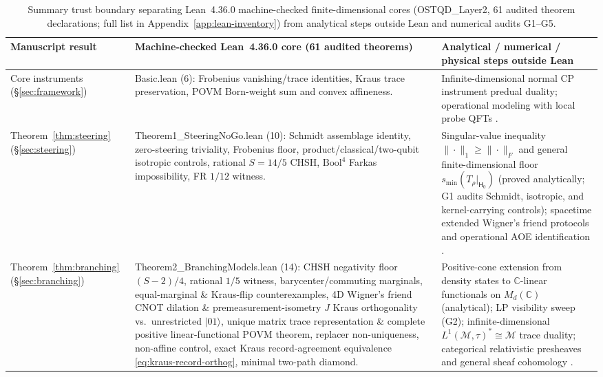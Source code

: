 \documentclass[11pt,a4paper]{article}
\theoremstyle{definition}
\theoremstyle{remark}
\newcommand{\cM}{\mathcal{M}}
\newcommand{\bbC}{\mathbb{C}}
\newcommand{\1}{\mathbf{1}}
\newcommand{\code}[1]{{\scriptsize\ttfamily #1}}
\begin{document}
\begin{table}[!tb]
\centering
\caption{Summary trust boundary separating Lean~4.36.0 machine-checked finite-dimensional cores (\code{OSTQD\_Layer2}, 61 audited theorem declarations; full list in Appendix~\ref{app:lean-inventory}) from analytical steps outside Lean and numerical audits G1--G5.}
\label{tab:trust-boundary}
\scriptsize
\begin{tabular}{@{} >{\raggedright\arraybackslash}p{2.3cm} >{\raggedright\arraybackslash}p{6.2cm} >{\raggedright\arraybackslash}p{6.2cm} @{}}
\toprule
Manuscript result & Machine-checked Lean~4.36.0 core (61 audited theorems) & Analytical / numerical / physical steps outside Lean \\
\midrule
Core instruments (\S\ref{sec:framework}) &
\code{Basic.lean} (6): Frobenius vanishing/trace identities, Kraus trace preservation, POVM Born-weight sum and convex affineness. &
Infinite-dimensional normal CP instrument predual duality; operational modeling with local probe QFTs \cite{FewsterVerch2020}. \\
\midrule
Theorem~\ref{thm:steering} (\S\ref{sec:steering}) &
\code{Theorem1\_SteeringNoGo.lean} (10): Schmidt assemblage identity, zero-steering triviality, Frobenius floor, product/classical/two-qubit isotropic controls, rational $S=14/5$ CHSH, $\mathrm{Bool}^4$ Farkas impossibility, FR $1/12$ witness. &
Singular-value inequality $\|\cdot\|_1\ge\|\cdot\|_F$ and general finite-dimensional floor $s_{\min}(T_\rho|_{\mathsf{H}_0})$ (proved analytically; G1 audits Schmidt, isotropic, and kernel-carrying controls); spacetime extended Wigner's friend protocols and operational AOE identification \cite{Bong2020,HausmannRenner2025}. \\
\midrule
Theorem~\ref{thm:branching} (\S\ref{sec:branching}) &
\code{Theorem2\_BranchingModels.lean} (14): CHSH negativity floor $(S-2)/4$, rational $1/5$ witness, barycenter/commuting marginals, equal-marginal \& Kraus-flip counterexamples, 4D Wigner's friend CNOT dilation \& premeasurement-isometry $J$ Kraus orthogonality vs.\ unrestricted $|01\rangle$, unique matrix trace representation \& complete positive linear-functional POVM theorem, replacer non-uniqueness, non-affine control, exact Kraus record-agreement equivalence \eqref{eq:kraus-record-orthog}, minimal two-path diamond. &
Positive-cone extension from density states to $\bbC$-linear functionals on $M_d(\bbC)$ (analytical); LP visibility sweep (G2); infinite-dimensional $L^1(\cM,\tau)^*\cong\cM$ trace duality; categorical relativistic presheaves and general sheaf cohomology \cite{AbramskyBrandenburger2011}. \\

\end{tabular}
\end{table}
\end{document}
